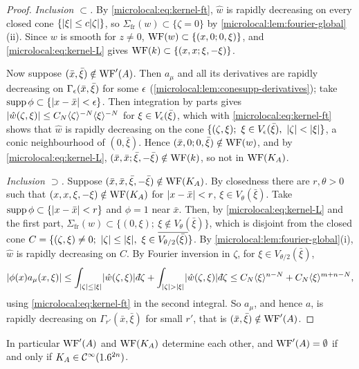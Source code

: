 \begin{proof}
  \emph{Inclusion $\subset$.} By \eqref{microlocal:eq:kernel-ft}, $\hat w$ is
  rapidly decreasing on every closed cone $\{\lvert \xi\rvert\le c\lvert \zeta\rvert\}$, so
  $\Sigma_{\mathrm{fr}}(w)\subset\{\zeta=0\}$ by \cref{microlocal:lem:fourier-global}(ii).
  Since $w$ is smooth for $z\ne0$, $\operatorname{WF}(w)\subset\{(x,0;0,\xi)\}$, and
  \eqref{microlocal:eq:kernel-L} gives $\operatorname{WF}(k)\subset\{(x,x;\xi,-\xi)\}$.

  Now suppose $(\bar x,\bar\xi)\notin\operatorname{WF}'(A)$. Then $a_\mu$ and all its
  derivatives are rapidly decreasing on $\Gamma_\epsilon(\bar x,\bar\xi)$ for some
  $\epsilon$ (\cref{microlocal:lem:conesupp-derivatives}); take
  $\operatorname{supp}\phi\subset\{\lvert x-\bar x\rvert<\epsilon\}$. Then integration by parts gives
  $\lvert \hat w(\zeta,\xi)\rvert\le C_N\langle \zeta\rangle^{-N}\langle \xi\rangle^{-N}$ for
  $\xi\in V_\epsilon(\bar\xi)$, which with \eqref{microlocal:eq:kernel-ft} shows
  that $\hat w$ is rapidly decreasing on the cone
  $\{(\zeta,\xi);\ \xi\in V_\eps(\bar\xi),\ \abs\zeta<\abs\xi\}$, a conic
  neighbourhood of $(0,\bar\xi)$. Hence $(\bar x,0;0,\bar\xi)\notin\operatorname{WF}(w)$,
  and by \eqref{microlocal:eq:kernel-L},
  $(\bar x,\bar x;\bar\xi,-\bar\xi)\notin\operatorname{WF}(k)$, so not in $\operatorname{WF}(K_A)$.

  \emph{Inclusion $\supset$.} Suppose
  $(\bar x,\bar x,\bar\xi,-\bar\xi)\notin\operatorname{WF}(K_A)$. By closedness there are
  $r,\theta>0$ such that $(x,x,\xi,-\xi)\notin\operatorname{WF}(K_A)$ for $\lvert x-\bar
  x\rvert<r$, $\xi\in V_\theta(\bar\xi)$. Take $\operatorname{supp}\phi\subset\{\lvert x-\bar
  x\rvert<r\}$ and $\phi=1$ near $\bar x$. Then, by
  \eqref{microlocal:eq:kernel-L} and the first part,
  $\Sigma_{\mathrm{fr}}(w)\subset\{(0,\xi);\ \xi\notin V_\theta(\bar\xi)\}$, which is
  disjoint from the closed cone
  $C=\{(\zeta,\xi)\ne0;\ \lvert \zeta\rvert\le\lvert \xi\rvert,\ \xi\in
  \overline{V_{\theta/2}(\bar\xi)}\}$. By
  \cref{microlocal:lem:fourier-global}(i), $\hat w$ is rapidly decreasing on
  $C$. By Fourier inversion in $\zeta$, for $\xi\in V_{\theta/2}(\bar\xi)$,
  \begin{equation*}
    \abs{\phi(x)a_\mu(x,\xi)}\le\int_{\abs\zeta\le\abs\xi}\abs{\hat w(\zeta,\xi)}\,\dbar\zeta
    +\int_{\abs\zeta>\abs\xi}\abs{\hat w(\zeta,\xi)}\,\dbar\zeta
    \le C_N\ang\xi^{n-N}+C_N\ang\xi^{m+n-N},
  \end{equation*}
  using \eqref{microlocal:eq:kernel-ft} in the second integral. So $a_\mu$,
  and hence $a$, is rapidly decreasing on $\Gamma_{r'}(\bar x,\bar\xi)$ for
  small $r'$, that is $(\bar x,\bar\xi)\notin\operatorname{WF}'(A)$.
\end{proof}

In particular $\operatorname{WF}'(A)$ and $\operatorname{WF}(K_A)$ determine each other, and
$\operatorname{WF}'(A)=\emptyset$ if and only if $K_A\in\mathcal{C}^\infty(1.6^{2n})$.

